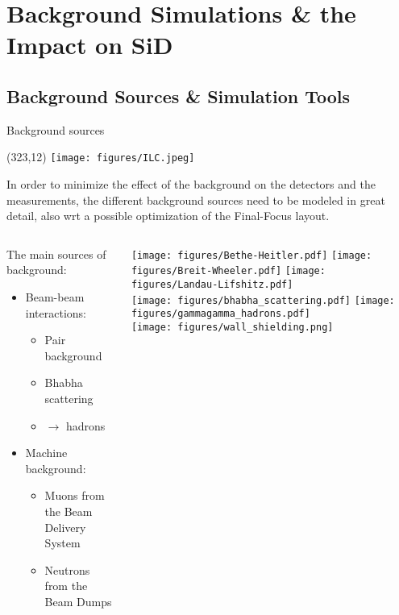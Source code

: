 \documentclass[xcolor={dvipsnames}]{beamer}
\newcommand{\ilclogo}{
  \setlength{\TPHorizModule}{1pt}
  \setlength{\TPVertModule}{1pt}
  \begin{textblock}{1}(323,12)
   \texttt{[image: figures/ILC.jpeg]}
  \end{textblock}
}
\begin{document}
\section{Background Simulations \& the Impact on SiD}

\subsection{Background Sources \& Simulation Tools}
\begin{frame}{Background sources}
\ilclogo
\begin{block}{}
In order to minimize the effect of the background on the detectors and the measurements, the different background sources need to be modeled in great detail, also wrt a possible optimization of the Final-Focus layout.
\end{block}
\begin{columns}
 \begin{column}{0.65\textwidth}
 The main sources of background:
 \vspace*{0.2cm}
  \begin{itemize}
    \item Beam-beam interactions:
    \begin{itemize}
      \item Pair background
      \item Bhabha scattering
      \item \textgamma \textgamma $\rightarrow$ hadrons
    \end{itemize}
    \vspace*{0.5cm}
    \item Machine background:
    \begin{itemize}
      \item Muons from the Beam Delivery System
      \item Neutrons from the Beam Dumps
    \end{itemize}
  \end{itemize}
 \end{column}
 \begin{column}{0.4\textwidth}
 \begin{center}
 \texttt{[image: figures/Bethe-Heitler.pdf]}
 \texttt{[image: figures/Breit-Wheeler.pdf]}
 \texttt{[image: figures/Landau-Lifshitz.pdf]}\\
 \texttt{[image: figures/bhabha\_scattering.pdf]} 
 \texttt{[image: figures/gammagamma\_hadrons.pdf]}\\
 \vspace*{0.3cm}
 \texttt{[image: figures/wall\_shielding.png]}  
 \end{center}
 \end{column}
\end{columns}
\end{frame}
\end{document}
